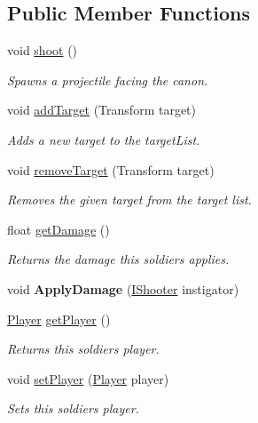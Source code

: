 \subsection*{Public Member Functions}
\begin{DoxyCompactItemize}
\item 
void \mbox{\hyperlink{class_soldier_a8eedc67afe2294da5cefb4712e719692}{shoot}} ()
\begin{DoxyCompactList}\small\item\em Spawns a projectile facing the canon. \end{DoxyCompactList}\item 
void \mbox{\hyperlink{class_soldier_ac0b4aade7a20111f04f4cb4c8eecf991}{add\+Target}} (Transform target)
\begin{DoxyCompactList}\small\item\em Adds a new target to the target\+List. \end{DoxyCompactList}\item 
void \mbox{\hyperlink{class_soldier_a2430cb561be4df43effa6e322a132316}{remove\+Target}} (Transform target)
\begin{DoxyCompactList}\small\item\em Removes the given target from the target list. \end{DoxyCompactList}\item 
float \mbox{\hyperlink{class_soldier_afda3f1b1994521eb21aeede43f291838}{get\+Damage}} ()
\begin{DoxyCompactList}\small\item\em Returns the damage this soldiers applies. \end{DoxyCompactList}\item 
\mbox{\label{class_soldier_a07fc376e3db48766643fe0afeba344a8}} 
void {\bfseries Apply\+Damage} (\mbox{\hyperlink{interface_i_shooter}{I\+Shooter}} instigator)
\item 
\mbox{\hyperlink{class_player}{Player}} \mbox{\hyperlink{class_soldier_a0295af34003267c45e4bbe1ce31fcdc2}{get\+Player}} ()
\begin{DoxyCompactList}\small\item\em Returns this soldiers player. \end{DoxyCompactList}\item 
void \mbox{\hyperlink{class_soldier_a302b0394d3480d637233770145a28e36}{set\+Player}} (\mbox{\hyperlink{class_player}{Player}} player)
\begin{DoxyCompactList}\small\item\em Sets this soldiers player. \end{DoxyCompactList}\item 

\end{DoxyCompactItemize}
